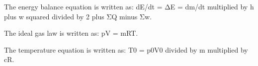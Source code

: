 The energy balance equation is written as:  
dE/dt = ΔE = dm/dt multiplied by h plus w squared divided by 2 plus ΣQ minus Σw.  

The ideal gas law is written as:  
pV = mRT.  

The temperature equation is written as:  
T0 = p0V0 divided by m multiplied by cR.